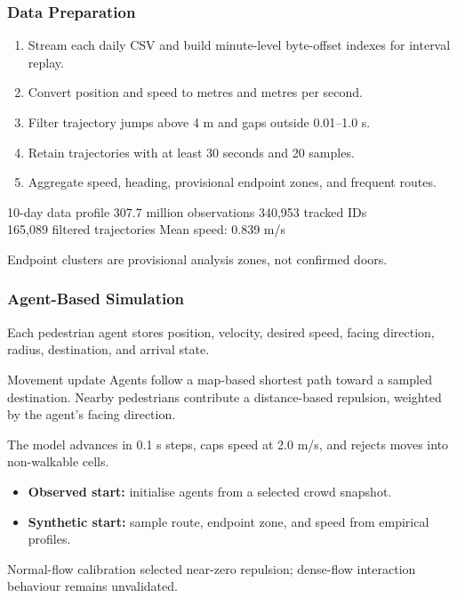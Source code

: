 \documentclass[aspectratio=43]{beamer}
\newcommand{\smallnote}[1]{{\tiny\color{black!65}#1}}
\begin{document}
\begin{frame}\frametitle{Data Preparation}
\small
\begin{enumerate}
\item Stream each daily CSV and build minute-level byte-offset indexes for interval replay.
\item Convert position and speed to metres and metres per second.
\item Filter trajectory jumps above 4 m and gaps outside 0.01--1.0 s.
\item Retain trajectories with at least 30 seconds and 20 samples.
\item Aggregate speed, heading, provisional endpoint zones, and frequent routes.
\end{enumerate}
\vspace{0.16cm}
\begin{block}{10-day data profile}
307.7 million observations \hfill 340,953 tracked IDs\\
165,089 filtered trajectories \hfill Mean speed: 0.839 m/s
\end{block}
\smallnote{Endpoint clusters are provisional analysis zones, not confirmed doors.}
\end{frame}

\begin{frame}\frametitle{Agent-Based Simulation}
\small
Each pedestrian agent stores position, velocity, desired speed, facing direction, radius, destination, and arrival state.
\vspace{0.14cm}
\begin{block}{Movement update}
Agents follow a map-based shortest path toward a sampled destination. Nearby pedestrians contribute a distance-based repulsion, weighted by the agent's facing direction.
\end{block}
The model advances in 0.1 s steps, caps speed at 2.0 m/s, and rejects moves into non-walkable cells.
\vspace{0.12cm}
\begin{itemize}
\item \textbf{Observed start:} initialise agents from a selected crowd snapshot.
\item \textbf{Synthetic start:} sample route, endpoint zone, and speed from empirical profiles.
\end{itemize}
\smallnote{Normal-flow calibration selected near-zero repulsion; dense-flow interaction behaviour remains unvalidated.}
\end{frame}
\end{document}
